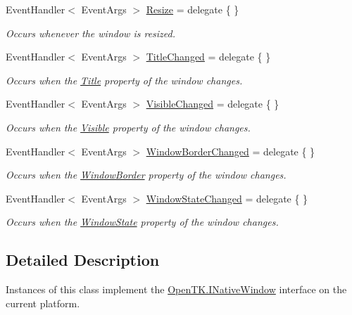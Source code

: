 \begin{DoxyCompactItemize}
Event\-Handler$<$ Event\-Args $>$ \hyperlink{class_open_t_k_1_1_native_window_a4fac914cf3df915f63f5de6f856bdfe6}{Resize} = delegate \{ \}
\begin{DoxyCompactList}\small\item\em Occurs whenever the window is resized. \end{DoxyCompactList}\item 
Event\-Handler$<$ Event\-Args $>$ \hyperlink{class_open_t_k_1_1_native_window_a25393018b81b7d842548407749b338cb}{Title\-Changed} = delegate \{ \}
\begin{DoxyCompactList}\small\item\em Occurs when the \hyperlink{class_open_t_k_1_1_native_window_af5cd587c921ef6c10709fc69a1e2900b}{Title} property of the window changes. \end{DoxyCompactList}\item 
Event\-Handler$<$ Event\-Args $>$ \hyperlink{class_open_t_k_1_1_native_window_af1678140a475ad9076116260b76fb98e}{Visible\-Changed} = delegate \{ \}
\begin{DoxyCompactList}\small\item\em Occurs when the \hyperlink{class_open_t_k_1_1_native_window_aff1fe36bb34bb3ba53814a7aaceea940}{Visible} property of the window changes. \end{DoxyCompactList}\item 
Event\-Handler$<$ Event\-Args $>$ \hyperlink{class_open_t_k_1_1_native_window_a1e42d7762769cd074dfb68496b0b2dbf}{Window\-Border\-Changed} = delegate \{ \}
\begin{DoxyCompactList}\small\item\em Occurs when the \hyperlink{class_open_t_k_1_1_native_window_a847af2dd07cb323f3a96767bb96ea44b}{Window\-Border} property of the window changes. \end{DoxyCompactList}\item 
Event\-Handler$<$ Event\-Args $>$ \hyperlink{class_open_t_k_1_1_native_window_a911c577473fdc8b422419e4677350c0f}{Window\-State\-Changed} = delegate \{ \}
\begin{DoxyCompactList}\small\item\em Occurs when the \hyperlink{class_open_t_k_1_1_native_window_a78e6278aa092a82f672ff838ac7c1e2d}{Window\-State} property of the window changes. \end{DoxyCompactList}\end{DoxyCompactItemize}


\subsection{Detailed Description}
Instances of this class implement the \hyperlink{interface_open_t_k_1_1_i_native_window}{Open\-T\-K.\-I\-Native\-Window} interface on the current platform. 



